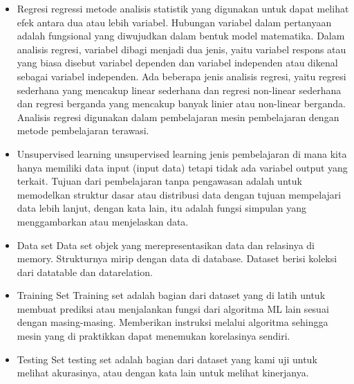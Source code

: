 \begin{enumerate}
\begin{itemize}
		\item Regresi
		\hfill\break
		regressi metode analisis statistik yang digunakan untuk dapat melihat efek antara dua atau lebih variabel. Hubungan variabel dalam pertanyaan adalah fungsional yang diwujudkan dalam bentuk model matematika. Dalam analisis regresi, variabel dibagi menjadi dua jenis, yaitu variabel respons atau yang biasa disebut variabel dependen dan variabel independen atau dikenal sebagai variabel independen. Ada beberapa jenis analisis regresi, yaitu regresi sederhana yang mencakup linear sederhana dan regresi non-linear sederhana dan regresi berganda yang mencakup banyak linier atau non-linear berganda. Analisis regresi digunakan dalam pembelajaran mesin pembelajaran dengan metode pembelajaran terawasi.
		\item Unsupervised learning 
		\hfill\break
		unsupervised learning jenis pembelajaran di mana kita hanya memiliki data input (input data) tetapi tidak ada variabel output yang terkait. Tujuan dari pembelajaran tanpa pengawasan adalah untuk memodelkan struktur dasar atau distribusi data dengan tujuan mempelajari data lebih lanjut, dengan kata lain, itu adalah fungsi simpulan yang menggambarkan atau menjelaskan data.
		\item Data set
		\hfill\break
		Data set objek yang merepresentasikan data dan relasinya di memory. Strukturnya mirip dengan data di database. Dataset berisi koleksi dari datatable dan datarelation.
		\item Training Set
		\hfill\break
		Training set adalah bagian dari dataset yang di latih untuk membuat prediksi atau menjalankan fungsi dari algoritma ML lain sesuai dengan masing-masing. Memberikan instruksi melalui algoritma sehingga mesin yang di praktikkan dapat menemukan korelasinya sendiri.
		\item Testing Set
		\hfill\break
		testing set adalah bagian dari dataset yang kami uji untuk melihat akurasinya, atau dengan kata lain untuk melihat kinerjanya.
	\end{itemize}
\end{enumerate}
